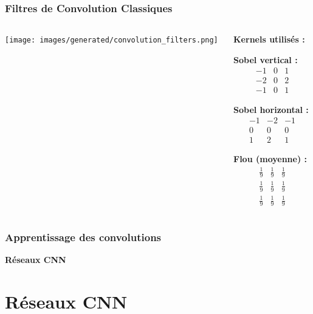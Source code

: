 \documentclass{beamer}
\begin{document}
\begin{frame}
    \frametitle{Filtres de Convolution Classiques}
    \begin{columns}
        \begin{column}{0.6\textwidth}
            \texttt{[image: images/generated/convolution\_filters.png]}
        \end{column}
        \begin{column}{0.4\textwidth}
            \textbf{Kernels utilisés :}
            \vspace{0.3cm}
            
            \textbf{Sobel vertical :}
            \[
            \begin{smallmatrix}
            -1 & 0 & 1 \\
            -2 & 0 & 2 \\
            -1 & 0 & 1
            \end{smallmatrix}
            \]
            
            \textbf{Sobel horizontal :}
            \[
            \begin{smallmatrix}
            -1 & -2 & -1 \\
            0 & 0 & 0 \\
            1 & 2 & 1
            \end{smallmatrix}
            \]
            
            \textbf{Flou (moyenne) :}
            \[
            \begin{smallmatrix}
                \frac{1}{9} & \frac{1}{9} & \frac{1}{9} \\
                \frac{1}{9} & \frac{1}{9} & \frac{1}{9} \\
                \frac{1}{9} & \frac{1}{9} & \frac{1}{9}
            \end{smallmatrix}
            \]
        \end{column}
    \end{columns}
\end{frame}

\begin{frame}
    \frametitle{Apprentissage des convolutions}
    \begin{center}
        \Huge{\textbf{Réseaux CNN}}
    \end{center}
\end{frame}

\section{Réseaux CNN}
\end{document}
